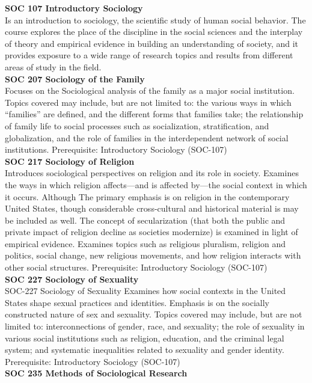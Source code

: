 \documentclass[
  letterpaper,
]{scrbook}
\begin{document}
\textbf{SOC 107 Introductory Sociology}\\
Is an introduction to sociology, the scientific study of human social
behavior. The course explores the place of the discipline in the social
sciences and the interplay of theory and empirical evidence in building
an understanding of society, and it provides exposure to a wide range of
research topics and results from different areas of study in the
field.\\
\textbf{SOC 207 Sociology of the Family}\\
Focuses on the Sociological analysis of the family as a major social
institution. Topics covered may include, but are not limited to: the
various ways in which ``families'' are defined, and the different forms
that families take; the relationship of family life to social processes
such as socialization, stratification, and globalization, and the role
of families in the interdependent network of social institutions.
Prerequisite: Introductory Sociology (SOC-107)\\
\textbf{SOC 217 Sociology of Religion}\\
Introduces sociological perspectives on religion and its role in
society. Examines the ways in which religion affects---and is affected
by---the social context in which it occurs. Although The primary
emphasis is on religion in the contemporary United States, though
considerable cross-cultural and historical material is may be included
as well. The concept of secularization (that both the public and private
impact of religion decline as societies modernize) is examined in light
of empirical evidence. Examines topics such as religious pluralism,
religion and politics, social change, new religious movements, and how
religion interacts with other social structures. Prerequisite:
Introductory Sociology (SOC-107)\\
\textbf{SOC 227 Sociology of Sexuality}\\
SOC-227 Sociology of Sexuality Examines how social contexts in the
United States shape sexual practices and identities. Emphasis is on the
socially constructed nature of sex and sexuality. Topics covered may
include, but are not limited to: interconnections of gender, race, and
sexuality; the role of sexuality in various social institutions such as
religion, education, and the criminal legal system; and systematic
inequalities related to sexuality and gender identity. Prerequisite:
Introductory Sociology (SOC-107)\\
\textbf{SOC 235 Methods of Sociological Research}\\
\end{document}
